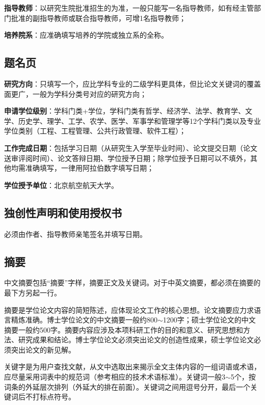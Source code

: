 {\bfseries 指导教师}：以研究生院批准招生的为准，一般只能写一名指导教师，如有经主管部门批准的副指导教师或联合指导教师，可增1名指导教师；

{\bfseries 培养院系}：应准确填写培养的学院或独立系的全称。

\subsection{题名页}

{\bfseries 研究方向}：只填写一个，应比学科专业的二级学科更具体，但比论文关键词的覆盖面更广，一般为学科分类号对应的研究方向；

{\bfseries 申请学位级别}：学科门类+学位，学科门类有哲学、经济学、法学、教育学、文学、历史学、理学、工学、农学、医学、军事学和管理学等12个学科门类以及专业学位类别（工程、工程管理、公共行政管理、软件工程）；

{\bfseries 工作完成日期}：包括学习日期（从研究生入学至毕业时间）、论文提交日期（论文送审评阅时间）、论文答辩日期、学位授予日期；除学位授予日期可以不填外，其他均需准确填写，一律用阿拉伯数字填写日期；

{\bfseries 学位授予单位}：北京航空航天大学。

\subsection{独创性声明和使用授权书}

必须由作者、指导教师亲笔签名并填写日期。

\subsection{摘要}

中文摘要包括“摘要”字样，摘要正文及关键词。对于中英文摘要，都必须在摘要的最下方另起一行。

摘要是学位论文内容的简短陈述，应体现论文工作的核心思想。论文摘要应力求语言精炼准确。博士学位论文的中文摘要一般约800$\sim$1200字；硕士学位论文的中文摘要一般约500字。摘要内容应涉及本项科研工作的目的和意义、研究思想和方法、研究成果和结论。博士学位论文必须突出论文的创造性成果，硕士学位论文必须突出论文的新见解。

关键字是为用户查找文献，从文中选取出来揭示全文主体内容的一组词语或术语，应尽量采用词表中的规范词（参考相应的技术术语标准）。关键词一般3$\sim$5个，按词条的外延层次排列（外延大的排在前面）。关键词之间用逗号分开，最后一个关键词后不打标点符号。

